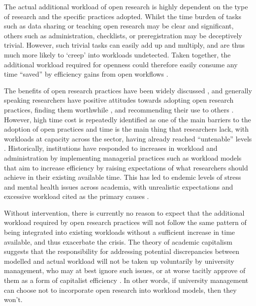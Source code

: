 \documentclass[ authordate, meta, issue]{jote-new-article}
\begin{document}
The actual additional workload of open research is highly dependent on the type of research and the specific practices adopted. Whilst the time burden of tasks such as data sharing or teaching open research may be clear and significant, others such as administration, checklists, or preregistration may be deceptively trivial. However, such trivial tasks can easily add up and multiply, and are thus much more likely to ‘creep’ into workloads undetected. Taken together, the additional workload required for openness could therefore easily consume any time “saved” by efficiency gains from open workflows \parencites{Lowndes2017}.



The benefits of open research practices have been widely discussed \parencites{Munafò2017}, and generally speaking researchers have positive attitudes towards adopting open research practices, finding them worthwhile \parencites{Eynden2016}{Lowndes2017}, and recommending their use to others \parencites{Sarafoglou2022}. However, high time cost is repeatedly identified as one of the main barriers to the adoption of open practices \parencites{Eynden2016}{Gownaris2022}{Tenopir2011} and time is the main thing that researchers lack, with workloads at capacity across the sector, having already reached “untenable” levels \parencites{Long2020}{Papadopoulos2017}. Historically, institutions have responded to increases in workload and administration by implementing managerial practices such as workload models that aim to increase efficiency by raising expectations of what researchers should achieve in their existing available time. This has led to endemic levels of stress and mental health issues across academia, with unrealistic expectations and excessive workload cited as the primary causes \parencites{Nicholls2022}{Urbina-Garcia2020}.



Without intervention, there is currently no reason to expect that the additional workload required by open research practices will not follow the same pattern of being integrated into existing workloads without a sufficient increase in time available, and thus exacerbate the crisis. The theory of academic capitalism suggests that the responsibility for addressing potential discrepancies between modelled and actual workload will not be taken up voluntarily by university management, who may at best ignore such issues, or at worse tacitly approve of them as a form of capitalist efficiency \parencites{Lyons2010}. In other words, if university management can choose not to incorporate open research into workload models, then they won’t.
\end{document}
